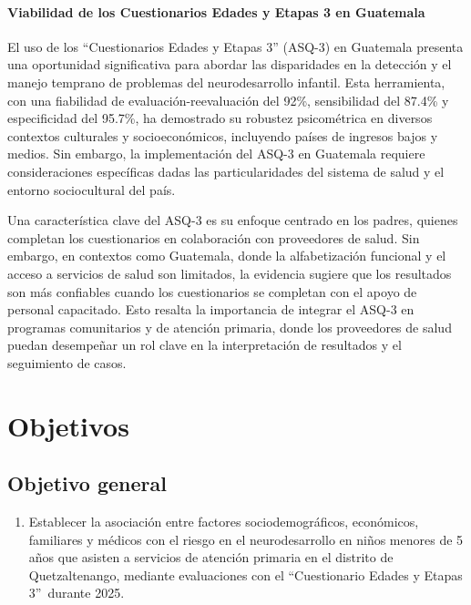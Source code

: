 \documentclass[11pt,letterpaper]{report}
\newcommand{\asq}{“Cuestionario Edades y Etapas 3”}
\begin{document}
\subsubsection{Viabilidad de los Cuestionarios Edades y Etapas 3 en Guatemala}
El uso de los ``Cuestionarios Edades y Etapas 3'' (ASQ-3) en Guatemala presenta
una oportunidad significativa para abordar las disparidades en la detección y
el manejo temprano de problemas del neurodesarrollo infantil. Esta herramienta,
con una fiabilidad de evaluación-reevaluación del 92\%, sensibilidad del 87.4\%
y especificidad del 95.7\%, ha demostrado su robustez psicométrica en diversos
contextos culturales y socioeconómicos, incluyendo países de ingresos bajos y
medios. Sin embargo, la implementación del ASQ-3 en Guatemala requiere
consideraciones específicas dadas las particularidades del sistema de salud y
el entorno sociocultural del país. \cite{Vameghi2013-uo, Manasyan2023}

Una característica clave del ASQ-3 es su enfoque centrado en los padres,
quienes completan los cuestionarios en colaboración con proveedores de salud.
Sin embargo, en contextos como Guatemala, donde la alfabetización funcional y
el acceso a servicios de salud son limitados, la evidencia sugiere que los
resultados son más confiables cuando los cuestionarios se completan con el
apoyo de personal capacitado. Esto resalta la importancia de integrar el ASQ-3
en programas comunitarios y de atención primaria, donde los proveedores de
salud puedan desempeñar un rol clave en la interpretación de resultados y el
seguimiento de casos. \cite{Manasyan2023, Colbert2021}

	\chapter{Objetivos}
\section{Objetivo general}
	\begin{enumerate}
		\item Establecer la asociación entre factores sociodemográficos,
		económicos, familiares y médicos con el riesgo en el neurodesarrollo en
		niños menores de 5 años que asisten a servicios de atención primaria en
		el distrito de Quetzaltenango, mediante evaluaciones con el \asq\
		durante 2025.
	\end{enumerate}
\end{document}
